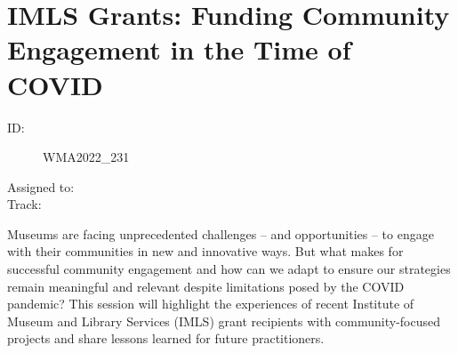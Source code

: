 \documentclass{report}
\begin{document}
              

              
        
          \newpage
          \section{ IMLS Grants: Funding Community Engagement in the Time of COVID }
            \begin{description}
              \item [ID:]
              WMA2022\_231

              \item [Assigned to:]
                \item [Track:]
              \end{description}

              Museums are facing unprecedented challenges – and opportunities – to engage with their communities in new and innovative ways. But what makes for successful community engagement and how can we adapt to ensure our strategies remain meaningful and relevant despite limitations posed by the COVID pandemic? This session will highlight the experiences of recent Institute of Museum and Library Services (IMLS) grant recipients with community-focused projects and share lessons learned for future practitioners.
\end{document}
